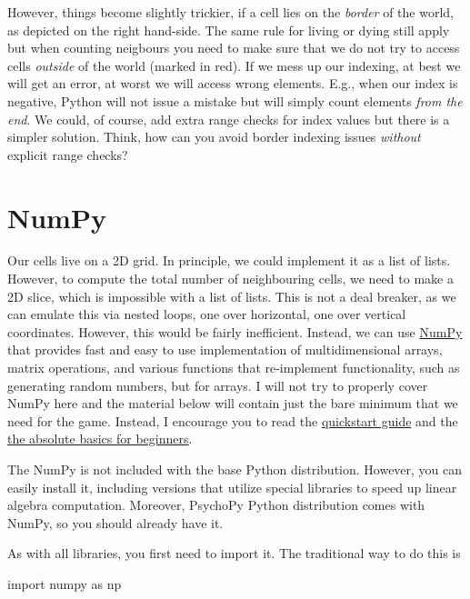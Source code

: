 \documentclass[
]{book}
\newenvironment{Shaded}{\begin{snugshade}}{\end{snugshade}}
\newcommand{\ImportTok}[1]{#1}
\newcommand{\NormalTok}[1]{#1}
\begin{document}
However, things become slightly trickier, if a cell lies on the \emph{border} of the world, as depicted on the right hand-side. The same rule for living or dying still apply but when counting neigbours you need to make sure that we do not try to access cells \emph{outside} of the world (marked in red). If we mess up our indexing, at best we will get an error, at worst we will access wrong elements. E.g., when our index is negative, Python will not issue a mistake but will simply count elements \emph{from the end}. We could, of course, add extra range checks for index values but there is a simpler solution. Think, how can you avoid border indexing issues \emph{without} explicit range checks?

\hypertarget{numpy}{%
\section{NumPy}\label{numpy}}

Our cells live on a 2D grid. In principle, we could implement it as a list of lists. However, to compute the total number of neighbouring cells, we need to make a 2D slice, which is impossible with a list of lists. This is not a deal breaker, as we can emulate this via nested loops, one over horizontal, one over vertical coordinates. However, this would be fairly inefficient. Instead, we can use \href{https://numpy.org/}{NumPy} that provides fast and easy to use implementation of multidimensional arrays, matrix operations, and various functions that re-implement functionality, such as generating random numbers, but for arrays. I will not try to properly cover NumPy here and the material below will contain just the bare minimum that we need for the game. Instead, I encourage you to read the \href{quickstart.html}{quickstart guide} and the \href{https://numpy.org/doc/stable/user/absolute_beginners.html}{the absolute basics for beginners}.

The NumPy is not included with the base Python distribution. However, you can easily install it, including versions that utilize special libraries to speed up linear algebra computation. Moreover, PsychoPy Python distribution comes with NumPy, so you should already have it.

As with all libraries, you first need to import it. The traditional way to do this is

\begin{Shaded}
\begin{Highlighting}[]
\ImportTok{import}\NormalTok{ numpy }\ImportTok{as}\NormalTok{ np}
\end{Highlighting}
\end{Shaded}
\end{document}
